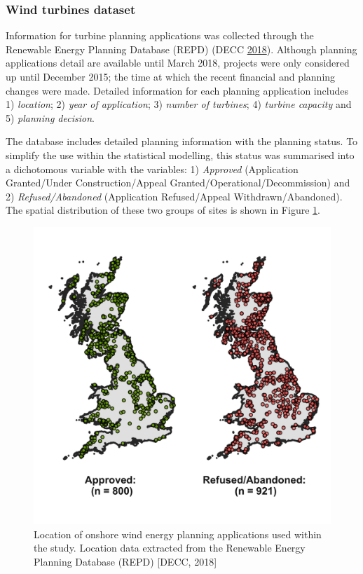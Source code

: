 \documentclass[a4paper,]{article}
\theoremstyle{definition}
\theoremstyle{definition}
\theoremstyle{definition}
\theoremstyle{remark}
\begin{document}
\hypertarget{wind-turbines-dataset}{%
\subsubsection{Wind turbines dataset}\label{wind-turbines-dataset}}

Information for turbine planning applications was collected through the
Renewable Energy Planning Database (REPD) (DECC
\protect\hyperlink{ref-DECC2018}{2018}). Although planning applications
detail are available until March 2018, projects were only considered up
until December 2015; the time at which the recent financial and planning
changes were made. Detailed information for each planning application
includes 1) \emph{location}; 2) \emph{year of application}; 3)
\emph{number of turbines}; 4) \emph{turbine capacity} and 5)
\emph{planning decision}.

The database includes detailed planning information with the planning
status. To simplify the use within the statistical modelling, this
status was summarised into a dichotomous variable with the variables: 1)
\emph{Approved} (Application Granted/Under Construction/Appeal
Granted/Operational/Decommission) and 2) \emph{Refused/Abandoned}
(Application Refused/Appeal Withdrawn/Abandoned). The spatial
distribution of these two groups of sites is shown in Figure
\ref{fig:StudyExtent}.

\begin{figure}[h]

{\centering \includegraphics[width=0.5\linewidth]{figures/figure6} 

}

\caption{Location of onshore wind energy planning applications used within the study. Location data extracted from the Renewable Energy Planning Database (REPD) [DECC, 2018]}\label{fig:StudyExtent}
\end{figure}
\end{document}
